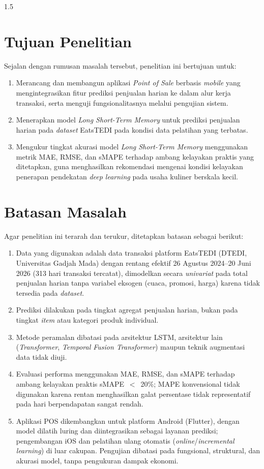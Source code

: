 \documentclass[12pt, a4paper, onecolumn, oneside]{report}
\begin{document}
\begin{spacing}{1.5}
\section{Tujuan Penelitian}
Sejalan dengan rumusan masalah tersebut, penelitian ini bertujuan untuk:
\begin{enumerate}
    \item Merancang dan membangun aplikasi \textit{Point of Sale} berbasis \textit{mobile} yang mengintegrasikan fitur prediksi penjualan harian ke dalam alur kerja transaksi, serta menguji fungsionalitasnya melalui pengujian sistem.
    \item Menerapkan model \textit{Long Short-Term Memory} untuk prediksi penjualan harian pada \textit{dataset} EatsTEDI pada kondisi data pelatihan yang terbatas.
    \item Mengukur tingkat akurasi model \textit{Long Short-Term Memory} menggunakan metrik MAE, RMSE, dan sMAPE terhadap ambang kelayakan praktis yang ditetapkan, guna menghasilkan rekomendasi mengenai kondisi kelayakan penerapan pendekatan \textit{deep learning} pada usaha kuliner berskala kecil.
\end{enumerate}

\section{Batasan Masalah}
Agar penelitian ini terarah dan terukur, ditetapkan batasan sebagai berikut:
\begin{enumerate}
    \item Data yang digunakan adalah data transaksi platform EatsTEDI (DTEDI, Universitas Gadjah Mada) dengan rentang efektif 26 Agustus 2024--20 Juni 2026 (313 hari transaksi tercatat), dimodelkan secara \textit{univariat} pada total penjualan harian tanpa variabel eksogen (cuaca, promosi, harga) karena tidak tersedia pada \textit{dataset}.
    \item Prediksi dilakukan pada tingkat agregat penjualan harian, bukan pada tingkat \textit{item} atau kategori produk individual.
    \item Metode peramalan dibatasi pada arsitektur LSTM, arsitektur lain (\textit{Transformer}, \textit{Temporal Fusion Transformer}) maupun teknik augmentasi data tidak diuji.
    \item Evaluasi performa menggunakan MAE, RMSE, dan sMAPE terhadap ambang kelayakan praktis sMAPE~$<$~20\%; MAPE konvensional tidak digunakan karena rentan menghasilkan galat persentase tidak representatif pada hari berpendapatan sangat rendah.
    \item Aplikasi POS dikembangkan untuk platform Android (Flutter), dengan model dilatih luring dan diintegrasikan sebagai layanan prediksi; pengembangan iOS dan pelatihan ulang otomatis (\textit{online}/\textit{incremental learning}) di luar cakupan. Pengujian dibatasi pada fungsional, struktural, dan akurasi model, tanpa pengukuran dampak ekonomi.
\end{enumerate}


\end{spacing}
\end{document}
